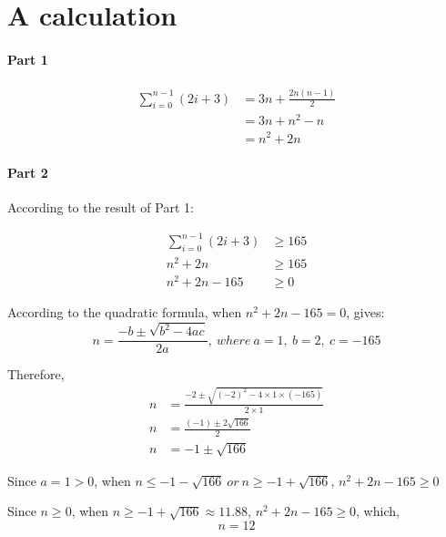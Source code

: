 \documentclass[12pt]{article}
\begin{document}
\newpage
\section*{A calculation}
\paragraph{Part 1}
\begin{align*}
    \sum_{i=0}^{n-1} (2i + 3) &= 3n  + \frac{2n(n-1)}{2} \\
    &= 3n + n^2 - n \\
    &= n^2 + 2n
\end{align*}

\paragraph{Part 2} 
According to the result of Part 1:

\begin{align*}
	\sum_{i=0}^{n-1} (2i + 3) &\geq 165 \\
	n^2 + 2n &\geq 165 \\
	n^2 + 2n -165 &\geq 0
\end{align*}

According to the quadratic formula, when $n^2 + 2n -165 = 0 $, gives:
$$n=\frac{-b\pm \sqrt{b^2-4ac}}{2a},\ where\ a=1,\ b=2,\ c=-165$$

Therefore,
\begin{align*}
	n&=\frac{-2\pm \sqrt{(-2)^2-4\times1\times(-165)}}{2\times1} \\
	n&=\frac{(-1)\pm 2\sqrt{166}}{2} \\
	n&=-1\pm\sqrt{166}
\end{align*}

Since $a=1>0$, when $n\leq-1-\sqrt{166}\ or\ n\geq-1+\sqrt{166}$, $n^2 + 2n -165 \geq 0$

Since $n\geq0$, when $n\geq-1+\sqrt{166}\approx11.88 $, $n^2 + 2n -165 \geq 0$, which,
$$n = 12$$
\end{document}
